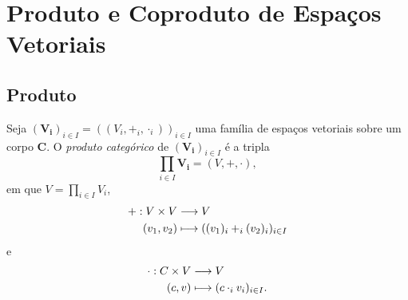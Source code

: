 \section{Produto e Coproduto de Espaços Vetoriais}

\subsection{Produto}

\begin{defi}
Seja $(\bm{V_i})_{i \in I} = ((V_i,+_i,\cdot_i))_{i \in I}$ uma família de espaços vetoriais sobre um corpo $\bm C$. O \emph{produto categórico} de $(\bm{V_i})_{i \in I}$ é a tripla
	\begin{equation*}
	\prod_{i \in I} \bm{V_i} = (V,+,\cdot),
	\end{equation*}
em que $V = \prod_{i \in I} V_i$,
	\begin{align*}
	{+}: {V \times V} &\longrightarrow {V} \\{(v_1,v_2)} &\longmapsto {((v_1)_i +_i (v_2)_i)_{i \in I}}
	\end{align*}
e
	\begin{align*}
	{\cdot}: {C \times V} &\longrightarrow {V} \\{(c,v)} &\longmapsto {(c \cdot_i v_i)_{i \in I}.}
	\end{align*}
\end{defi}

